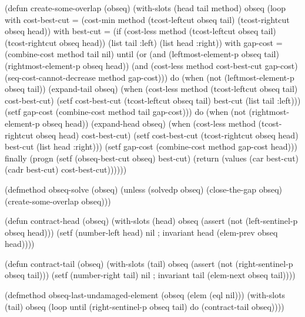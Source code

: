 (defun create-some-overlap (obseq)
  (with-slots (head tail method) obseq
    (loop with cost-best-cut = (cost-min method
                                         (tcost-leftcut obseq tail)
                                         (tcost-rightcut obseq head))
          with best-cut = (if (cost-less method
                                         (tcost-leftcut obseq tail)
                                         (tcost-rightcut obseq head))
                              (list tail :left)
                              (list head :right))
          with gap-cost = (combine-cost method tail nil)
          until (or (and (leftmost-element-p obseq tail)
                         (rightmost-element-p obseq head))
                    (and (cost-less method cost-best-cut gap-cost)
                         (seq-cost-cannot-decrease method gap-cost)))
          do (when (not (leftmost-element-p obseq tail))
               (expand-tail obseq)
               (when (cost-less method (tcost-leftcut obseq tail) cost-best-cut)
                 (setf cost-best-cut (tcost-leftcut obseq tail)
                       best-cut (list tail :left)))
               (setf gap-cost (combine-cost method tail gap-cost)))
          do (when (not (rightmost-element-p obseq head))
               (expand-head obseq)
               (when (cost-less method (tcost-rightcut obseq head) cost-best-cut)
                 (setf cost-best-cut (tcost-rightcut obseq head)
                       best-cut (list head :right)))
               (setf gap-cost (combine-cost method gap-cost head)))
          finally (progn (setf (obseq-best-cut obseq) best-cut)
                         (return (values (car best-cut) (cadr best-cut) cost-best-cut))))))

(defmethod obseq-solve (obseq)
  (unless (solvedp obseq)
    (close-the-gap obseq)
    (create-some-overlap obseq)))

(defun contract-head (obseq)
  (with-slots (head) obseq
    (assert (not (left-sentinel-p obseq head)))
    (setf (number-left head) nil ; invariant
          head (elem-prev obseq head))))

(defun contract-tail (obseq)
  (with-slots (tail) obseq
    (assert (not (right-sentinel-p obseq tail)))
    (setf (number-right tail) nil ; invariant
          tail (elem-next obseq tail))))

(defmethod obseq-last-undamaged-element (obseq (elem (eql nil)))
  (with-slots (tail) obseq
    (loop until (right-sentinel-p obseq tail)
          do (contract-tail obseq))))

